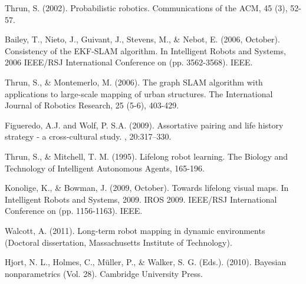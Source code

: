 \documentclass [twoside,hidelinks]{article}
\begin{document}
\begin{thebibliography}{9}

\newblock Thrun, S.  (2002). Probabilistic robotics. Communications of the ACM, 45 (3), 52-57.


\newblock Bailey, T., Nieto, J., Guivant, J., Stevens, M., \& Nebot, E.  (2006, October). Consistency of the EKF-SLAM algorithm. In Intelligent Robots and Systems, 2006 IEEE/RSJ International Conference on  (pp. 3562-3568). IEEE.

\newblock Thrun, S., \& Montemerlo, M.  (2006). The graph SLAM algorithm with applications to large-scale mapping of urban structures. The International Journal of Robotics Research, 25 (5-6), 403-429.

Figueredo, A.J. and Wolf, P. S.A.  (2009).
\newblock Assortative pairing and life history strategy - a cross-cultural
  study.
, 20:317--330.

\newblock Thrun, S., \& Mitchell, T. M.  (1995). Lifelong robot learning. The Biology and Technology of Intelligent Autonomous Agents, 165-196.

\newblock Konolige, K., \& Bowman, J.  (2009, October). Towards lifelong visual maps. In Intelligent Robots and Systems, 2009. IROS 2009. IEEE/RSJ International Conference on  (pp. 1156-1163). IEEE.

\newblock Walcott, A.  (2011). Long-term robot mapping in dynamic environments  (Doctoral dissertation, Massachusetts Institute of Technology).

\newblock Hjort, N. L., Holmes, C., Müller, P., \& Walker, S. G.  (Eds.).  (2010). Bayesian nonparametrics  (Vol. 28). Cambridge University Press.





\end{thebibliography}
\end{document}
